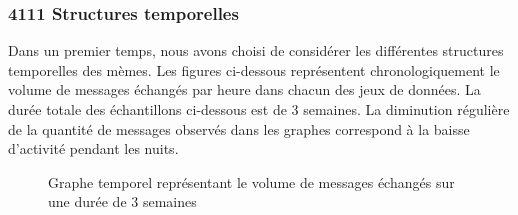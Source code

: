 \subsubsection[Structures temporelles]{4111 Structures temporelles}
Dans un premier temps, nous avons choisi de consid\'erer les
diff\'erentes structures temporelles des m\`emes. Les figures
ci-dessous repr\'esentent chronologiquement le volume de messages
\'echang\'es par heure dans chacun des jeux de donn\'ees. La dur\'ee
totale des \'echantillons ci-dessous est de 3 semaines. La diminution
r\'eguli\`ere de la quantit\'e de messages observ\'es dans les graphes
correspond \`a la baisse d{\textquoteright}activit\'e pendant les
nuits.

\begin{figure}
    \centering
    \caption{
      Graphe temporel repr\'esentant le volume de messages \'echang\'es sur une dur\'ee de 3 semaines    
    }
\end{figure}


